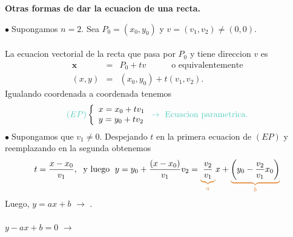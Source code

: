 \documentclass{article}
\theoremstyle{definition}
\theoremstyle{remark}
\newcommand\bl{$\bullet\;$}
\begin{document}
\begin{center}
\textbf{Otras formas de dar la ecuacion de una recta.}
\end{center}
\bl Supongamos $n=2$. Sea $P_0 = (x_0,y_0)$ y $v=(v_1,v_2) \neq (0,0)$. \\\\ La ecuacion vectorial de la recta que pasa por $P_0$ y tiene direccion $v$ es \[ \begin{array}{rcl}
  \mathbf{x}& = & P_0+tv \quad \quad \quad \text{o equivalentemente} \\ 
  (x,y) & = & (x_0,y_0) + t(v_1,v_2).
\end{array}
\] 
Igualando coordenada a coordenada tenemos \[ 
  \textcolor{verdep2}{(EP)} \left\{\begin{array}{l}
x = x_0+tv_1 \\
y=y_0+tv_2
\end{array}\right. \textcolor{verdep2}{\to \text{ Ecuacion parametrica.}}
\] 
\bl Supongamos que $v_1 \neq 0$. Despejando $t$ en la primera ecuacion de $(EP)$ y reemplazando en la segunda obtenemos \[
t=\frac{x-x_0}{v_1},\;  \text{ y luego }\; y = y_0 + \frac{(x-x_0)}{v_1} v_2 = \textcolor{rojop2}{\underbrace{\textcolor{black}{\frac{v_2}{v_1}}}_{a}} x + \textcolor{rojop2}{\underbrace{\textcolor{black}{\left (y_0 - \frac{v_2}{v_1} x_0 \right )}}_{b}}
\]
Luego, $y=ax+b$ \textcolor{verdep2}{$\to$ }. \\\\ \phantom{Luego,} $y-ax+b=0$ \textcolor{verdep2}{$\to$ }
\end{document}

